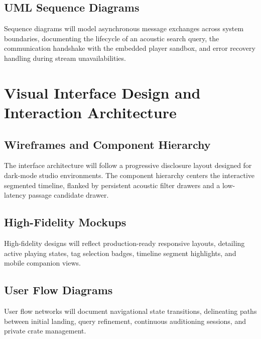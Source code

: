 \subsection{UML Sequence Diagrams}
Sequence diagrams will model asynchronous message exchanges across system boundaries, documenting the lifecycle of an acoustic search query, the communication handshake with the embedded player sandbox, and error recovery handling during stream unavailabilities.

\section{Visual Interface Design and Interaction Architecture}

\subsection{Wireframes and Component Hierarchy}
The interface architecture will follow a progressive disclosure layout designed for dark-mode studio environments. The component hierarchy centers the interactive segmented timeline, flanked by persistent acoustic filter drawers and a low-latency passage candidate drawer.

\subsection{High-Fidelity Mockups}
High-fidelity designs will reflect production-ready responsive layouts, detailing active playing states, tag selection badges, timeline segment highlights, and mobile companion views.

\subsection{User Flow Diagrams}
User flow networks will document navigational state transitions, delineating paths between initial landing, query refinement, continuous auditioning sessions, and private crate management.
